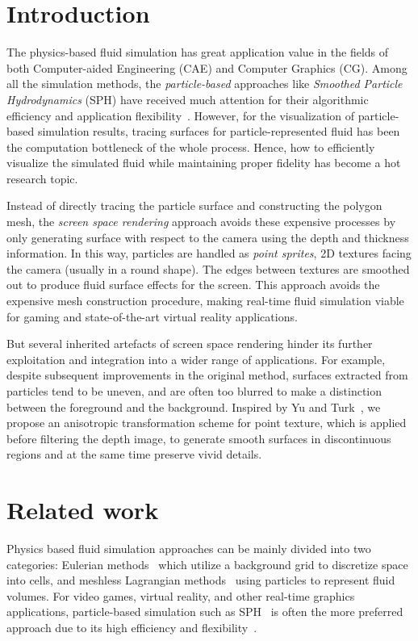 \documentclass[times,twocolumn,final]{elsarticle}
\begin{document}
\linenumbers

\section{Introduction}
\label{sec1}
The physics-based fluid simulation has great application value in the fields of both Computer-aided Engineering (CAE) and Computer Graphics (CG).
Among all the simulation methods, the \emph{particle-based} approaches like \emph{Smoothed Particle Hydrodynamics} (SPH) have received much attention for their algorithmic efficiency and application flexibility~\cite{Ihmsen14}. 
However, for the visualization of particle-based simulation results, tracing surfaces for particle-represented fluid has been the computation bottleneck of the whole process. Hence, how to efficiently visualize the simulated fluid while maintaining proper fidelity has become a hot research topic.

Instead of directly tracing the particle surface and constructing the polygon mesh, the \emph{screen space rendering} approach avoids these expensive processes by only generating surface with respect to the camera using the depth and thickness information. In this way, particles are handled as \emph{point sprites}, 2D textures facing the camera (usually in a round shape). The edges between textures are smoothed out to produce fluid surface effects for the screen\cite{ref:ref2}. This approach avoids the expensive mesh construction procedure, making real-time fluid simulation viable for gaming and state-of-the-art virtual reality applications\cite{ref:ref3}. 

But several inherited artefacts of screen space rendering hinder its further exploitation and integration into a wider range of applications. For example, despite subsequent improvements in the original method, surfaces extracted from particles tend to be uneven, and are often too blurred to make a distinction between the foreground and the background. Inspired by Yu and Turk~\cite{yu2013reconstructing}, we propose an anisotropic transformation scheme for point texture, which is applied before filtering the depth image, to generate smooth surfaces in discontinuous regions and at the same time preserve vivid details.

\section{Related work}
Physics based fluid simulation approaches can be mainly divided into two categories: Eulerian methods~\cite{ref:ref4} which utilize a background grid to discretize space into cells, and meshless Lagrangian methods~\cite{ref:ref7} using particles to represent fluid volumes. For video games, virtual reality, and other real-time graphics applications, particle-based simulation such as SPH~\cite{IISPH2013,DFSPH2015,ref:ref5} is often the more preferred approach due to its high efficiency and flexibility~\cite{carensac2022optimizations}. 
\end{document}
